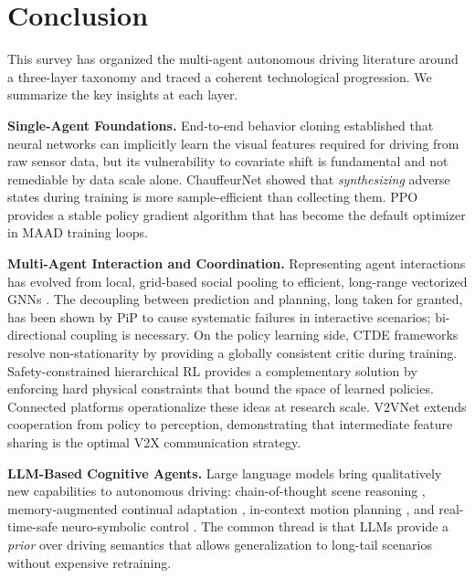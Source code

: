 \documentclass[12pt, a4paper]{article}
\begin{document}
\section{Conclusion}
\label{sec:conclusion}

This survey has organized the multi-agent autonomous driving literature around a
three-layer taxonomy and traced a coherent technological progression. We summarize
the key insights at each layer.

\textbf{Single-Agent Foundations.}
End-to-end behavior cloning \citep{bojarski2016end} established that neural
networks can implicitly learn the visual features required for driving from raw
sensor data, but its vulnerability to covariate shift is fundamental and not
remediable by data scale alone. ChauffeurNet \citep{bansal2018chauffeur} showed
that \emph{synthesizing} adverse states during training is more sample-efficient
than collecting them. PPO \citep{schulman2017proximal} provides a stable policy
gradient algorithm that has become the default optimizer in MAAD training loops.

\textbf{Multi-Agent Interaction and Coordination.}
Representing agent interactions has evolved from local, grid-based social pooling
\citep{alahi2016social} to efficient, long-range vectorized GNNs
\citep{gao2020vectornet}. The decoupling between prediction and planning, long
taken for granted, has been shown by PiP \citep{song2020pip} to cause systematic
failures in interactive scenarios; bi-directional coupling is necessary. On the
policy learning side, CTDE frameworks \citep{lowe2017multi} resolve non-stationarity
by providing a globally consistent critic during training. Safety-constrained
hierarchical RL \citep{shalev2016safe} provides a complementary solution by
enforcing hard physical constraints that bound the space of learned policies.
Connected platforms \citep{palanisamy2020multi, zhou2020smarts} operationalize
these ideas at research scale. V2VNet \citep{wang2020v2vnet} extends cooperation
from policy to perception, demonstrating that intermediate feature sharing is the
optimal V2X communication strategy.

\textbf{LLM-Based Cognitive Agents.}
Large language models bring qualitatively new capabilities to autonomous driving:
chain-of-thought scene reasoning \citep{fu2023drive}, memory-augmented continual
adaptation \citep{wen2023dilu}, in-context motion planning \citep{mao2023gpt},
and real-time-safe neuro-symbolic control \citep{sha2023languagempc}. The common
thread is that LLMs provide a \emph{prior} over driving semantics that allows
generalization to long-tail scenarios without expensive retraining.
\end{document}
